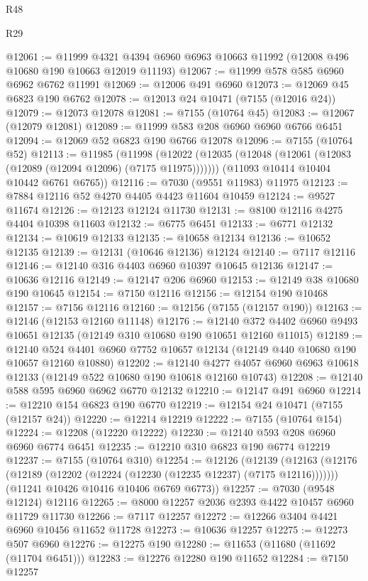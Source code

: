 \begin{lexlean}{R48}
\begin{lexlean}{R29}
\begin{coremodule}
{{{{{{{{{{{{{{{{{{{{{{{{{{{{{{{{{{{{{{{{{{{{{{{{{{{{{{{{{{{{{{{{{{{{{{{{{{{{{{{{{{{{{{{{{{{{{{{{{{{{{{{{{{{{{{{{{{{{{{{{{{{{{{{{{{{{{{{{{{{{{{{{{{{{{{{{{{{{{{{{{{{{{{{{{{{{{{{{{{{{{{{{{{{{{{{{{{{{{{{{{{{{{{{{{{{{{{{{{{@12061 := @11999
    @4321
    @4394
    @6960
    @6963
    @10663
    @11992
    (@12008 @496 @10680 @190 @10663 @12019 @11193)
@12067 := @11999 @578 @585 @6960 @6962 @6762 @11991
@12069 := @12006 @491 @6960
@12073 := @12069 @45 @6823 @190 @6762
@12078 := @12013 @24 @10471 (@7155 (@12016 @24))
@12079 := @12073 @12078
@12081 := @7155 (@10764 @45)
@12083 := @12067 (@12079 @12081)
@12089 := @11999 @583 @208 @6960 @6960 @6766 @6451
@12094 := @12069 @52 @6823 @190 @6766 @12078
@12096 := @7155 (@10764 @52)
@12113 := @11985
    (@11998
      (@12022 (@12035 (@12048 (@12061 (@12083 (@12089 (@12094 @12096) (@7175 @11975)))))))
      (@11093 @10414 @10404 @10442 @6761 @6765))
@12116 := @7030 (@9551 @11983) @11975
@12123 := @7884 @12116 @52 @4270 @4405 @4423 @11604 @10459
@12124 := @9527 @11674
@12126 := @12123 @12124 @11730
@12131 := @8100 @12116 @4275 @4404 @10398 @11603
@12132 := @6775 @6451
@12133 := @6771 @12132
@12134 := @10619 @12133
@12135 := @10658 @12134
@12136 := @10652 @12135
@12139 := @12131 (@10646 @12136) @12124
@12140 := @7117 @12116
@12146 := @12140 @316 @4403 @6960 @10397 @10645 @12136
@12147 := @10636 @12116
@12149 := @12147 @206 @6960
@12153 := @12149 @38 @10680 @190 @10645
@12154 := @7150 @12116
@12156 := @12154 @190 @10468
@12157 := @7156 @12116
@12160 := @12156 (@7155 (@12157 @190))
@12163 := @12146 (@12153 @12160 @11148)
@12176 := @12140 @372 @4402 @6960 @9493 @10651 @12135 (@12149 @310 @10680 @190 @10651 @12160 @11015)
@12189 := @12140 @524 @4401 @6960 @7752 @10657 @12134 (@12149 @440 @10680 @190 @10657 @12160 @10880)
@12202 := @12140
    @4277
    @4057
    @6960
    @6963
    @10618
    @12133
    (@12149 @522 @10680 @190 @10618 @12160 @10743)
@12208 := @12140 @588 @595 @6960 @6962 @6770 @12132
@12210 := @12147 @491 @6960
@12214 := @12210 @154 @6823 @190 @6770
@12219 := @12154 @24 @10471 (@7155 (@12157 @24))
@12220 := @12214 @12219
@12222 := @7155 (@10764 @154)
@12224 := @12208 (@12220 @12222)
@12230 := @12140 @593 @208 @6960 @6960 @6774 @6451
@12235 := @12210 @310 @6823 @190 @6774 @12219
@12237 := @7155 (@10764 @310)
@12254 := @12126
    (@12139
      (@12163 (@12176 (@12189 (@12202 (@12224 (@12230 (@12235 @12237) (@7175 @12116)))))))
      (@11241 @10426 @10416 @10406 @6769 @6773))
@12257 := @7030 (@9548 @12124) @12116
@12265 := @8000 @12257 @2036 @2393 @4422 @10457 @6960 @11729 @11730
@12266 := @7117 @12257
@12272 := @12266 @3404 @4421 @6960 @10456 @11652 @11728
@12273 := @10636 @12257
@12275 := @12273 @507 @6960
@12276 := @12275 @190
@12280 := @11653 (@11680 (@11692 (@11704 @6451)))
@12283 := @12276 @12280 @190 @11652
@12284 := @7150 @12257
}}}}}}}}}}}}}}}}}}}}}}}}}}}}}}}}}}}}}}}}}}}}}}}}}}}}}}}}}}}}}}}}}}}}}}}}}}}}}}}}}}}}}}}}}}}}}}}}}}}}}}}}}}}}}}}}}}}}}}}}}}}}}}}}}}}}}}}}}}}}}}}}}}}}}}}}}}}}}}}}}}}}}}}}}}}}}}}}}}}}}}}}}}}}}}}}}}}}}}}}}}}}}}}}}}}}}}}}}}
\end{coremodule}
\end{lexlean}
\end{lexlean}
